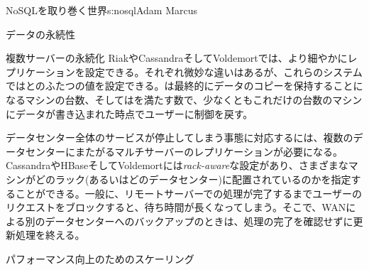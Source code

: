 \begin{aosachapter}{NoSQLを取り巻く世界}{s:nosql}{Adam Marcus}
\begin{aosasect1}{データの永続性}
\begin{aosasect2}{複数サーバーの永続化}
RiakやCassandraそしてVoldemortでは、より細やかにレプリケーションを設定できる。それぞれ微妙な違いはあるが、これらのシステムではとのふたつの値を設定できる。は最終的にデータのコピーを保持することになるマシンの台数、そしてはを満たす数で、少なくともこれだけの台数のマシンにデータが書き込まれた時点でユーザーに制御を戻す。

データセンター全体のサービスが停止してしまう事態に対応するには、複数のデータセンターにまたがるマルチサーバーのレプリケーションが必要になる。CassandraやHBaseそしてVoldemortには\emph{rack-aware}な設定があり、さまざまなマシンがどのラック(あるいはどのデータセンター)に配置されているのかを指定することができる。一般に、リモートサーバーでの処理が完了するまでユーザーのリクエストをブロックすると、待ち時間が長くなってしまう。そこで、WANによる別のデータセンターへのバックアップのときは、処理の完了を確認せずに更新処理を終える。

\end{aosasect2}

\end{aosasect1}

\begin{aosasect1}{パフォーマンス向上のためのスケーリング}


\end{aosasect1}
\end{aosachapter}
